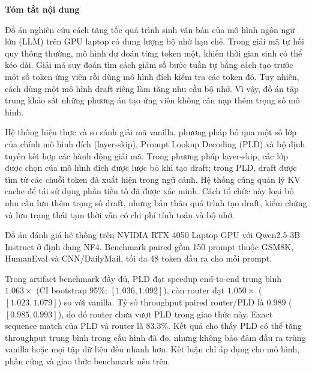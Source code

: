 
\begin{center}
    \Large{\textbf{Tóm tắt nội dung}}
\end{center}
\vspace{1cm}

Đồ án nghiên cứu cách tăng tốc quá trình sinh văn bản của mô hình ngôn ngữ lớn (LLM) trên GPU laptop có dung lượng bộ nhớ hạn chế. Trong giải mã tự hồi quy thông thường, mô hình dự đoán từng token một, khiến thời gian sinh có thể kéo dài. Giải mã suy đoán tìm cách giảm số bước tuần tự bằng cách tạo trước một số token ứng viên rồi dùng mô hình đích kiểm tra các token đó. Tuy nhiên, cách dùng một mô hình draft riêng làm tăng nhu cầu bộ nhớ. Vì vậy, đồ án tập trung khảo sát những phương án tạo ứng viên không cần nạp thêm trọng số mô hình.

Hệ thống hiện thực và so sánh giải mã vanilla, phương pháp bỏ qua một số lớp của chính mô hình đích (layer-skip), Prompt Lookup Decoding (PLD) và bộ định tuyến kết hợp các hành động giải mã. Trong phương pháp layer-skip, các lớp được chọn của mô hình đích được lược bỏ khi tạo draft; trong PLD, draft được tìm từ các chuỗi token đã xuất hiện trong ngữ cảnh. Hệ thống cũng quản lý KV cache để tái sử dụng phần tiền tố đã được xác minh. Cách tổ chức này loại bỏ nhu cầu lưu thêm trọng số draft, nhưng bản thân quá trình tạo draft, kiểm chứng và lưu trạng thái tạm thời vẫn có chi phí tính toán và bộ nhớ.

Đồ án đánh giá hệ thống trên NVIDIA RTX 4050 Laptop GPU với Qwen2.5-3B-Instruct ở định dạng NF4. Benchmark paired gồm 150 prompt thuộc GSM8K, HumanEval và CNN/\allowbreak DailyMail, tối đa 48 token đầu ra cho mỗi prompt.

Trong artifact benchmark đầy đủ, PLD đạt speedup end-to-end trung bình $1.063\times$ (CI bootstrap 95\%: $[1.036,1.092]$), còn router đạt $1.050\times$ ($[1.023,1.079]$) so với vanilla. Tỷ số throughput paired router/PLD là $0.989$ ($[0.985,0.993]$), do đó router chưa vượt PLD trong giao thức này. Exact sequence match của PLD và router là 83.3\%. Kết quả cho thấy PLD có thể tăng throughput trung bình trong cấu hình đã đo, nhưng không bảo đảm đầu ra trùng vanilla hoặc mọi tập dữ liệu đều nhanh hơn. Kết luận chỉ áp dụng cho mô hình, phần cứng và giao thức benchmark nêu trên.

